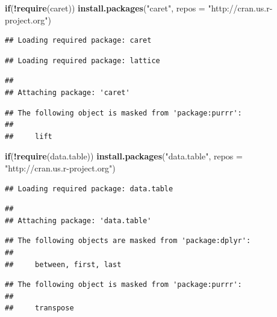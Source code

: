 \documentclass[
]{article}
\newenvironment{Shaded}{\begin{snugshade}}{\end{snugshade}}
\newcommand{\ControlFlowTok}[1]{\textcolor[rgb]{0.13,0.29,0.53}{\textbf{#1}}}
\newcommand{\DataTypeTok}[1]{\textcolor[rgb]{0.13,0.29,0.53}{#1}}
\newcommand{\KeywordTok}[1]{\textcolor[rgb]{0.13,0.29,0.53}{\textbf{#1}}}
\newcommand{\NormalTok}[1]{#1}
\newcommand{\OperatorTok}[1]{\textcolor[rgb]{0.81,0.36,0.00}{\textbf{#1}}}
\newcommand{\StringTok}[1]{\textcolor[rgb]{0.31,0.60,0.02}{#1}}
\begin{document}
\begin{Shaded}
\begin{Highlighting}[]
\ControlFlowTok{if}\NormalTok{(}\OperatorTok{!}\KeywordTok{require}\NormalTok{(caret)) }\KeywordTok{install.packages}\NormalTok{(}\StringTok{"caret"}\NormalTok{, }\DataTypeTok{repos =} \StringTok{"http://cran.us.r-project.org"}\NormalTok{)}
\end{Highlighting}
\end{Shaded}

\begin{verbatim}
## Loading required package: caret
\end{verbatim}

\begin{verbatim}
## Loading required package: lattice
\end{verbatim}

\begin{verbatim}
## 
## Attaching package: 'caret'
\end{verbatim}

\begin{verbatim}
## The following object is masked from 'package:purrr':
## 
##     lift
\end{verbatim}

\begin{Shaded}
\begin{Highlighting}[]
\ControlFlowTok{if}\NormalTok{(}\OperatorTok{!}\KeywordTok{require}\NormalTok{(data.table)) }\KeywordTok{install.packages}\NormalTok{(}\StringTok{"data.table"}\NormalTok{, }\DataTypeTok{repos =} \StringTok{"http://cran.us.r-project.org"}\NormalTok{)}
\end{Highlighting}
\end{Shaded}

\begin{verbatim}
## Loading required package: data.table
\end{verbatim}

\begin{verbatim}
## 
## Attaching package: 'data.table'
\end{verbatim}

\begin{verbatim}
## The following objects are masked from 'package:dplyr':
## 
##     between, first, last
\end{verbatim}

\begin{verbatim}
## The following object is masked from 'package:purrr':
## 
##     transpose
\end{verbatim}
\end{document}
